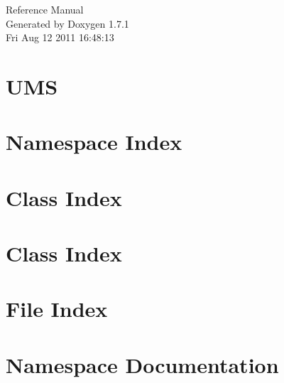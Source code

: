 \documentclass[a4paper]{book}
\begin{document}
\hypersetup{pageanchor=false}
\begin{titlepage}
\vspace*{7cm}
\begin{center}
{\Large Reference Manual}\\
\vspace*{1cm}
{\large Generated by Doxygen 1.7.1}\\
\vspace*{0.5cm}
{\small Fri Aug 12 2011 16:48:13}\\
\end{center}
\end{titlepage}
\clearemptydoublepage
{}
\tableofcontents
\clearemptydoublepage
{}
\hypersetup{pageanchor=true}
\chapter{UMS}
\label{index}\hypertarget{index}{}
\chapter{Namespace Index}

\chapter{Class Index}

\chapter{Class Index}

\chapter{File Index}

\chapter{Namespace Documentation}

\end{document}
